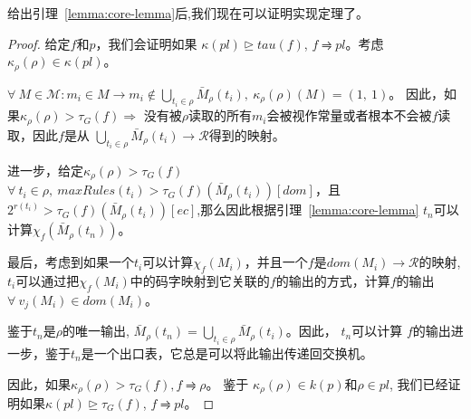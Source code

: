 %
%
%

给出引理~\ref{lemma:core-lemma}后,我们现在可以证明实现定理了。

\begin{proof}
给定$f$和$p$，我们会证明如果 $\kappa(pl)\trianglerighteq tau(f)$, $f \rightrightharpoons pl$。考虑 $\kappa_\rho(\rho) \in \kappa(pl)$。

$\forall\ M \in \mathcal{M} : m_i \in M \rightarrow m_i \notin \bigcup_{t_i \in \rho} \bar{M}_\rho(t_i),\ \kappa_\rho(\rho)(M) = (1,\ 1)$。 因此，如果$\kappa_\rho(\rho) > \tau_G(f) \Rightarrow$ 没有被$\rho$读取的所有$m_i$会被视作常量或者根本不会被$f$读取，因此$f$是从 $\bigcup_{t_i \in \rho} \bar{M}_\rho(t_i) \rightarrow \mathcal{R}$得到的映射。 

进一步，给定$\kappa_\rho(\rho) > \tau_G(f)$ $\forall\ t_i \in \rho,\ maxRules(t_i) > \tau_G(f)(\bar{M}_\rho(t_i))[dom]$，且$2^{r(t_i)} > \tau_G(f)(\bar{M}_\rho(t_i))[ec]$,那么因此根据引理~\ref{lemma:core-lemma} $t_n$可以计算$\chi_f(\bar{M}_\rho(t_n))$。

最后，考虑到如果一个$t_i$可以计算$\chi_f(M_i)$，并且一个$f$是$dom(M_i) \rightarrow \mathcal{R}$的映射, $t_i$可以通过把$\chi_f(M_i)$中的码字映射到它关联的$f$的输出的方式，计算$f$的输出$\forall\ v_j(M_i) \in dom(M_i)$。

鉴于$t_n$是$\rho$的唯一输出, $\bar{M}_\rho(t_n) = \bigcup_{t_i \in \rho} \bar{M}_\rho(t_i)$。因此， $t_n$可以计算 $f$的输出进一步，鉴于$t_n$是一个出口表，它总是可以将此输出传递回交换机。

因此，如果$\kappa_\rho(\rho) > \tau_G(f), f \rightrightharpoons \rho$。 鉴于 $\kappa_\rho(\rho) \in k(p)$和$\rho \in pl$, 我们已经证明如果$\kappa(pl)\trianglerighteq \tau_G(f)$, $f \rightrightharpoons pl$。
\end{proof}

